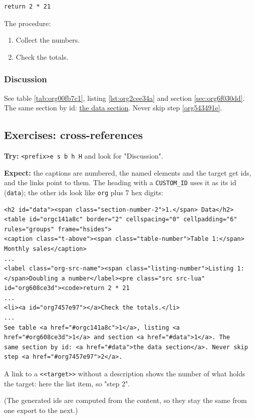 \begin{verbatim}
return 2 * 21
\end{verbatim}

The procedure:
\begin{enumerate}
\item Collect the numbers.
\item \label{org543491e}Check the totals.
\end{enumerate}
\subsubsection{Discussion}
\label{sec:org53d342f}
See table \ref{tab:org00fb7c1}, listing \ref{lst:org2cee34a} and section \ref{sec:org6f030dd}. The
same section by id: \hyperref[sec:org6f030dd]{the data section}. Never skip step \ref{org543491e}.
\subsection{Exercises: cross-references}
\label{sec:org254f1b8}
\textbf{Try:} \texttt{<prefix>e s b h H} and look for "Discussion".

\textbf{Expect:} the captions are numbered, the named elements and the target get
ids, and the links point to them. The heading with a \texttt{CUSTOM\_ID} uses it
as its id (\texttt{data}); the other ids look like \texttt{org} plus 7 hex digits:

\begin{verbatim}
<h2 id="data"><span class="section-number-2">1.</span> Data</h2>
<table id="orgc141a8c" border="2" cellspacing="0" cellpadding="6" rules="groups" frame="hsides">
<caption class="t-above"><span class="table-number">Table 1:</span> Monthly sales</caption>
...
<label class="org-src-name"><span class="listing-number">Listing 1: </span>Doubling a number</label><pre class="src src-lua" id="org608ce3d"><code>return 2 * 21
...
<li><a id="org7457e97"></a>Check the totals.</li>
...
See table <a href="#orgc141a8c">1</a>, listing <a href="#org608ce3d">1</a> and section <a href="#data">1</a>. The
same section by id: <a href="#data">the data section</a>. Never skip step <a href="#org7457e97">2</a>.
\end{verbatim}

A link to a \texttt{<{}<{}target>{}>{}} without a description shows the number of what
holds the target: here the list item, so "step 2".

(The generated ids are computed from the content, so they stay the same
from one export to the next.)

